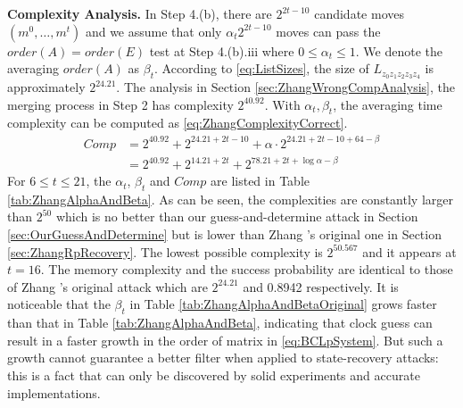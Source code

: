 \noindent\textbf{Complexity Analysis. }
In Step 4.(b), there are $2^{2t-10}$ candidate moves $(m^0,\ldots, m^{t})$ and we assume that only $\alpha_t 2^{2t-10}$ moves can pass the $order(A)=order(E)$ test at Step 4.(b).iii where $0\leq \alpha_t \leq 1$.
We denote the averaging $order(A)$ as $\beta_t$.
According to \eqref{eq:ListSizes}, the size of $L_{z_0z_1z_2z_3z_4}$ is approximately $2^{24.21}$.
The analysis in Section \ref{sec:ZhangWrongCompAnalysis}, the merging process in Step 2 has complexity $2^{40.92}$.
With $\alpha_t ,\beta_t $, the averaging time complexity can be computed as \eqref{eq:ZhangComplexityCorrect}.
\begin{equation}\label{eq:ZhangComplexityCorrect}
\begin{aligned}
Comp&=2^{40.92}+2^{24.21+2t-10}+\alpha \cdot 2^{24.21+2t-10+64-\beta}\\
&=2^{40.92}+2^{14.21+2t}+2^{78.21+2t+\log \alpha -\beta}
\end{aligned}
\end{equation}
For $6\leq t\leq 21$, the $\alpha_t$, $\beta_t$ and $Comp$ are listed in Table \ref{tab:ZhangAlphaAndBeta}.
As can be seen, the complexities are constantly larger than $2^{50}$ which is no better than our guess-and-determine attack in Section \ref{sec:OurGuessAndDetermine} but is lower than Zhang \etal's original one in Section \ref{sec:ZhangRpRecovery}.
The lowest possible complexity is $2^{50.567}$ and it appears at $t=16$.
The memory complexity and the success probability are identical to those of Zhang \etal's original attack which are $2^{24.21}$ and 0.8942 respectively.
It is noticeable that the $\beta_t$ in Table \ref{tab:ZhangAlphaAndBetaOriginal} grows faster than that in Table \ref{tab:ZhangAlphaAndBeta}, indicating that clock guess can result in a faster growth in the order of matrix in \eqref{eq:BCLpSystem}.
But such a growth cannot guarantee a better filter when applied to state-recovery attacks:
this is a fact that can only be discovered by solid experiments and accurate implementations.


